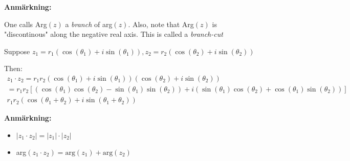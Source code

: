 \noindent\textbf{Anmärkning:}\par
\noindent One calls Arg$(z)$ a \textit{branch} of arg$(z)$. Also, note that Arg$(z)$ is "discontinous" along the negative real axis. This is called a \textit{branch-cut} 
\par\bigskip
\noindent Suppose $z_1 = r_1(\cos(\theta_1)+i\sin(\theta_1)), z_2 = r_2(\cos(\theta_2)+i\sin(\theta_2))$\par
\noindent Then:
\begin{equation*}
  \begin{gathered}
    z_1\cdot z_2 = r_1r_2(\cos(\theta_1)+i\sin(\theta_1))(\cos(\theta_2)+i\sin(\theta_2))\\
    =r_1r_2[(\cos(\theta_1)\cos(\theta_2)-\sin(\theta_1)\sin(\theta_2))+i(\sin(\theta_1)\cos(\theta_2)+\cos(\theta_1)\sin(\theta_2))]\\
    r_1r_2(\cos(\theta_1+\theta_2)+i\sin(\theta_1+\theta_2))
  \end{gathered}
\end{equation*}
\par\bigskip
\noindent\textbf{Anmärkning:}\par
\begin{itemize}
  \item $\left|z_1\cdot z_2\right| = \left|z_1\right|\cdot\left|z_2\right|$
  \item arg$(z_1\cdot z_2) = \text{arg}(z_1)+\text{arg}(z_2)$
\end{itemize}
\par\bigskip
